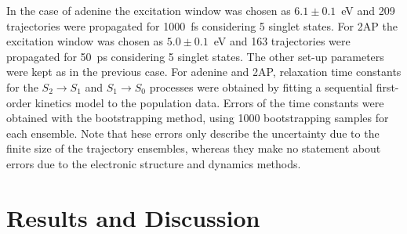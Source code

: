 \documentclass[twoside,twocolumn,9pt]{article}
\begin{document}
In the case of adenine the excitation window was chosen as $6.1\pm 0.1$~eV and 209 trajectories were propagated for 1000~fs considering 5 singlet states.
For 2AP the excitation window was chosen as $5.0\pm 0.1$~eV and 163 trajectories were propagated for 50~ps considering 5 singlet states.
The other set-up parameters were kept as in the previous case.
For adenine and 2AP, relaxation time constants for the $S_2\rightarrow S_1$ and $S_1\rightarrow S_0$ processes were obtained by fitting a sequential first-order kinetics model to the population data.
Errors of the time constants were obtained with the bootstrapping method,\cite{Nangia2004JCP} using 1000 bootstrapping samples for each ensemble.
Note that hese errors only describe the uncertainty due to the finite size of the trajectory ensembles, whereas they make no statement about errors due to the electronic structure and dynamics methods.

\section{Results and Discussion}
\end{document}
